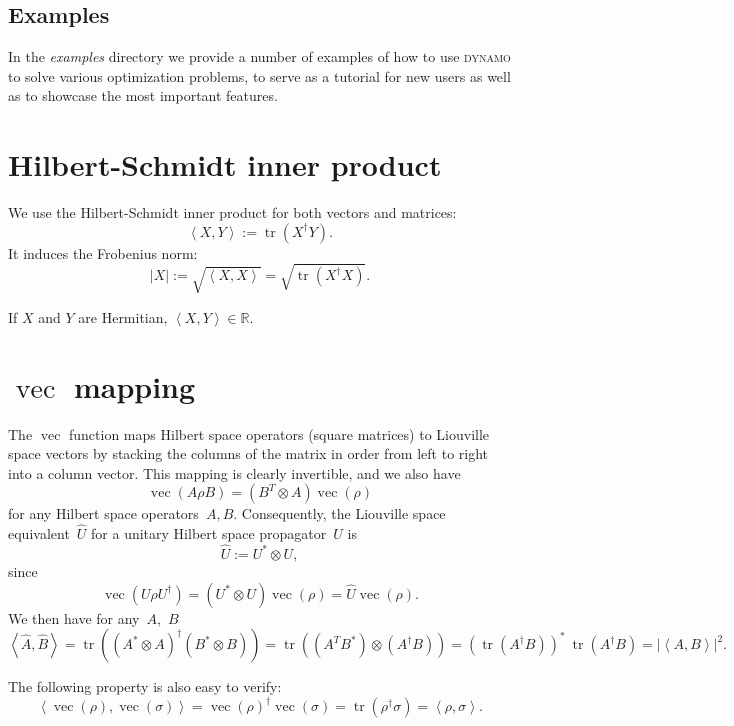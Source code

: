 \documentclass[aps, pra, a4paper, longbibliography, superscriptaddress]{revtex4-1}
\newcommand{\be}{\begin{equation}}
\newcommand{\ee}{\end{equation}}
\newcommand{\R}{{\mathbb R}}  %
\newcommand{\inprod}[2]{\left\langle #1, #2 \right\rangle}
\DeclareMathOperator{\tr}{tr}
\DeclareMathOperator{\cvec}{vec}
\newcommand{\DYNAMO}{\textsc{dynamo}}
\begin{document}
\subsection{Examples}
In the \emph{examples} directory we provide a number of examples of
how to use \DYNAMO{} to solve various optimization problems, to
serve as a tutorial for new users as well as to showcase the most important features.



\appendix
\section{Hilbert-Schmidt inner product}
\label{sec:hs}

We use the Hilbert-Schmidt inner product for both vectors and matrices:
\be
\inprod{X}{Y} := \tr\left(X^\dagger Y\right).
\ee
It induces the Frobenius norm:
\be
|X| := \sqrt{\inprod{X}{X}} = \sqrt{\tr\left(X^\dagger X\right)}.
\ee

If $X$ and $Y$ are Hermitian, $\inprod{X}{Y} \in \R$.

\section{$\cvec$ mapping}
\label{sec:vec}

The $\cvec$ function maps Hilbert space operators (square matrices) to
Liouville space vectors by stacking the columns of the matrix in order
from left to right into a column vector. This mapping is clearly
invertible, and we also have
\be
\cvec(A \rho B) = (B^T \otimes A) \cvec(\rho)
\ee
for any Hilbert space operators~$A, B$.
Consequently, the Liouville space equivalent~$\hat{U}$ for a unitary Hilbert space
propagator~$U$ is
\be
\label{eq:L-unitary}
\hat{U} := U^* \otimes U,
\ee
since
\be
\cvec(U \rho U^\dagger) = (U^* \otimes U) \cvec(\rho) = \hat{U} \cvec(\rho).
\ee
We then have for any~$A$,~$B$
\be
\label{eq:hat-product}
\inprod{\hat{A}}{\hat{B}}
= \tr((A^* \otimes A)^\dagger (B^* \otimes B))
= \tr((A^T B^*) \otimes (A^\dagger B))
= (\tr(A^\dagger B))^* \: \tr(A^\dagger B)
= |\inprod{A}{B}|^2.
\ee

The following property is also easy to verify:
\be
\inprod{\cvec(\rho)}{\cvec(\sigma)} = \cvec(\rho)^\dagger \cvec(\sigma)
= \tr(\rho^\dagger \sigma) = \inprod{\rho}{\sigma}.
\ee






\end{document}
